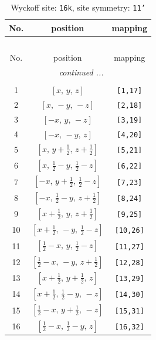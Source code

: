\documentclass[fleqn,8pt]{jsarticle}
\begin{document}
\begin{longtable}{ccc}
\caption{Wyckoff site: {\tt 16k}, site symmetry: {\tt 11'}}
 \\
 \hline \hline
No. & position & mapping \\ \hline \endfirsthead

\multicolumn{2}{l}{\tablename\ \thetable{}} \\
 \hline \hline
No. & position & mapping \\ \hline \endhead

 \hline \hline
\multicolumn{2}{r}{\footnotesize\it continued ...} \\ \endfoot

 \hline \hline
\multicolumn{2}{r}{} \\ \endlastfoot

1 & $\left[ x,\, y,\, z \right]$ & {\tt [1,17]} \\ \hline
2 & $\left[ x,\, - y,\, - z \right]$ & {\tt [2,18]} \\ \hline
3 & $\left[ - x,\, y,\, - z \right]$ & {\tt [3,19]} \\ \hline
4 & $\left[ - x,\, - y,\, z \right]$ & {\tt [4,20]} \\ \hline
5 & $\left[ x,\, y + \frac{1}{2},\, z + \frac{1}{2} \right]$ & {\tt [5,21]} \\ \hline
6 & $\left[ x,\, \frac{1}{2} - y,\, \frac{1}{2} - z \right]$ & {\tt [6,22]} \\ \hline
7 & $\left[ - x,\, y + \frac{1}{2},\, \frac{1}{2} - z \right]$ & {\tt [7,23]} \\ \hline
8 & $\left[ - x,\, \frac{1}{2} - y,\, z + \frac{1}{2} \right]$ & {\tt [8,24]} \\ \hline
9 & $\left[ x + \frac{1}{2},\, y,\, z + \frac{1}{2} \right]$ & {\tt [9,25]} \\ \hline
10 & $\left[ x + \frac{1}{2},\, - y,\, \frac{1}{2} - z \right]$ & {\tt [10,26]} \\ \hline
11 & $\left[ \frac{1}{2} - x,\, y,\, \frac{1}{2} - z \right]$ & {\tt [11,27]} \\ \hline
12 & $\left[ \frac{1}{2} - x,\, - y,\, z + \frac{1}{2} \right]$ & {\tt [12,28]} \\ \hline
13 & $\left[ x + \frac{1}{2},\, y + \frac{1}{2},\, z \right]$ & {\tt [13,29]} \\ \hline
14 & $\left[ x + \frac{1}{2},\, \frac{1}{2} - y,\, - z \right]$ & {\tt [14,30]} \\ \hline
15 & $\left[ \frac{1}{2} - x,\, y + \frac{1}{2},\, - z \right]$ & {\tt [15,31]} \\ \hline
16 & $\left[ \frac{1}{2} - x,\, \frac{1}{2} - y,\, z \right]$ & {\tt [16,32]} \\
\end{longtable}
\end{document}
